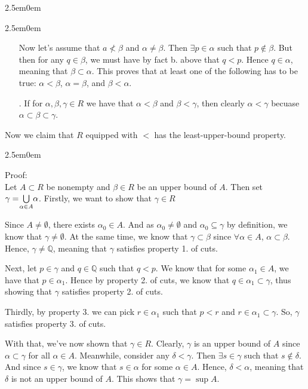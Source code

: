 \documentclass{book}
\newcommand{\mRoman}[1]{%
   \textrm{\MakeUppercase{\romannumeral #1}}%
}
\newcommand{\exTwo}{%
\color{Purple}%
   \fontsize{13}{15}\selectfont%
}
\newenvironment{myIndent}{%
   \begin{adjustwidth}{2.5em}{0em}%
}{%
   \end{adjustwidth}%
}
\newcommand{\myHS}{ \hspace{0.5em}}
\newcommand{\retTwo}{\hfill\bigbreak}
\begin{document}
\begin{myIndent}
\begin{myIndent}
\begin{itemize}
            Now let's assume that $a \not< \beta$ and $\alpha \not= \beta$. Then $\exists p \in \alpha$ such that $p \notin \beta$. But then for any $q \in \beta$, we must have by fact b. above that $q < p$. Hence $q \in \alpha$, meaning that $\beta \subset \alpha$. This proves that at least one of the following has to be true: $\alpha < \beta$,\myHS $\alpha = \beta$, and $\beta < \alpha$.\retTwo

            \item[\mRoman{2}.] If for $\alpha, \beta, \gamma \in R$ we have that $\alpha < \beta$ and $\beta < \gamma$, then clearly $\alpha < \gamma$ becuase $\alpha \subset \beta \subset \gamma$.\retTwo
         \end{itemize}
      \end{myIndent}

      Now we claim that $R$ equipped with $<$ has the least-upper-bound property.
      \begin{myIndent}\exTwo
         Proof:\\
         Let $A \subset R$ be nonempty and $\beta \in R$ be an upper bound of $A$. Then set\\ $\gamma = \hspace{-0.2em}\bigcup\limits_{\alpha \in A}\hspace{-0.2em}\alpha$. Firstly, we want to show that $\gamma \in R$\retTwo

         Since $A \neq \emptyset$, there exists $\alpha_0 \in A$. And as $\alpha_0 \neq \emptyset$ and $\alpha_0 \subseteq \gamma$ by definition, we know that $\gamma \neq \emptyset$. At the same time, we know that $\gamma \subset \beta$ since $\forall \alpha \in A$,\myHS $\alpha \subset \beta$. Hence, $\gamma \neq \mathbb{Q}$, meaning that $\gamma$ satisfies property 1$.$ of cuts.\retTwo

         Next, let $p \in \gamma$ and $q \in \mathbb{Q}$ such that $q < p$. We know that for some $\alpha_1 \in A$, we have that $p \in \alpha_1$. Hence by property 2$.$ of cuts, we know that $q \in \alpha_1 \subset \gamma$, thus showing that $\gamma$ satisfies property 2$.$ of cuts.\newpage
         
         Thirdly, by property 3$.$ we can pick $r \in \alpha_1$ such that $p < r$ and $r \in \alpha_1 \subset \gamma$. So, $\gamma$ satisfies property 3$.$ of cuts.\retTwo

         With that, we've now shown that $\gamma \in R$. Clearly, $\gamma$ is an upper bound of $A$ since $\alpha \subset \gamma$ for all $\alpha \in A$. Meanwhile, consider any $\delta < \gamma$. Then $\exists s \in \gamma$ such that $s \notin \delta$. And since $s \in \gamma$, we know that $s \in \alpha$ for some $\alpha \in A$. Hence, $\delta < \alpha$, meaning that $\delta$ is not an upper bound of $A$. This shows that $\gamma = \sup A$.\\ [6pt]
      \end{myIndent}


\end{myIndent}
\end{document}
